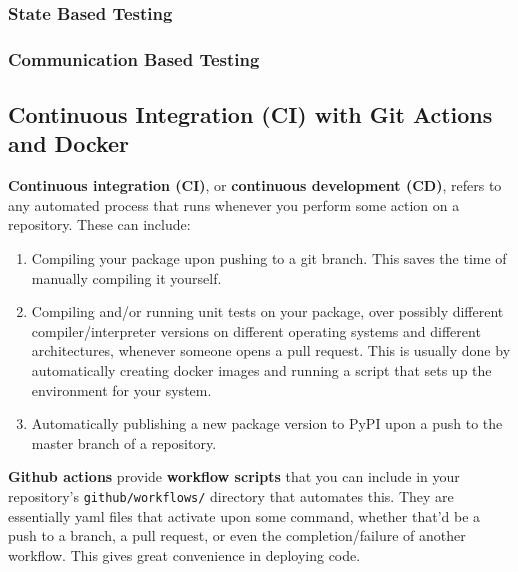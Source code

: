 \subsubsection{State Based Testing}

  \begin{definition}
    
  \end{definition}

\subsubsection{Communication Based Testing}

  \begin{definition}
    
  \end{definition}

\subsection{Continuous Integration (CI) with Git Actions and Docker} 

  \textbf{Continuous integration (CI)}, or \textbf{continuous development (CD)}, refers to any automated process that runs whenever you perform some action on a repository. These can include: 
  \begin{enumerate}
    \item Compiling your package upon pushing to a git branch. This saves the time of manually compiling it yourself. 
    \item Compiling and/or running unit tests on your package, over possibly different compiler/interpreter versions on different operating systems and different architectures, whenever someone opens a pull request. This is usually done by automatically creating docker images and running a script that sets up the environment for your system. 
    \item Automatically publishing a new package version to PyPI upon a push to the master branch of a repository. 
  \end{enumerate} 

  \textbf{Github actions} provide \textbf{workflow scripts} that you can include in your repository's \texttt{github/workflows/} directory that automates this. They are essentially yaml files that activate upon some command, whether that'd be a push to a branch, a pull request, or even the completion/failure of another workflow. This gives great convenience in deploying code. 


